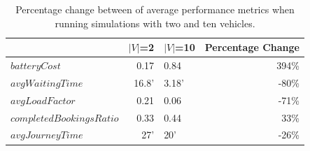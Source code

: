 \documentclass[12pt,a4paper]{article}
\begin{document}
\begin{table}[h]
\caption{Percentage change between of average performance metrics when running simulations with two and ten vehicles.}
\center
    \begin{tabular}{|l|r|l|r|}
      \toprule
    & $|V|$=2 & $|V|$=10 & Percentage Change\\
    \midrule
    $batteryCost$ & 0.17 & 0.84 & 394\%\\
    $avgWaitingTime$ & 16.8' & 3.18' & -80\% \\
    $avgLoadFactor$ & 0.21 & 0.06 & -71\% \\
    $completedBookingsRatio$ & 0.33 & 0.44 & 33\% \\
    $avgJourneyTime$ & 27' & 20' & -26\% \\
    \midrule
    \end{tabular}
    \label{averageschange}
  \end{table}
  
\end{document}
